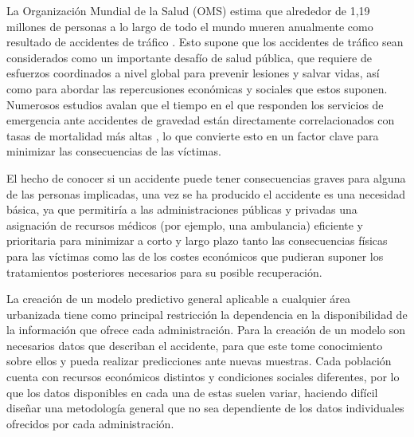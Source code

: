 \documentclass{uathesis-es}
\begin{document}






La Organización Mundial de la Salud (OMS) estima que alrededor de 1,19 millones de personas a lo largo de todo el mundo mueren anualmente como resultado de accidentes de tráfico \cite{WHO}. Esto supone que los accidentes de tráfico sean considerados como un importante desafío de salud pública, que requiere de esfuerzos coordinados a nivel global para prevenir lesiones y salvar vidas, así como para abordar las repercusiones económicas y sociales que estos suponen. Numerosos estudios avalan que el tiempo en el que responden los servicios de emergencia ante accidentes de gravedad están directamente correlacionados con tasas de mortalidad más altas \cite{timeresponse_deaths}, lo que convierte esto en un factor clave para minimizar las consecuencias de las víctimas.



El hecho de conocer si un accidente puede tener consecuencias graves para alguna de las personas implicadas, una vez se ha producido el accidente es una necesidad básica, ya que permitiría a las administraciones públicas y privadas una asignación de recursos médicos (por ejemplo, una ambulancia) eficiente y prioritaria para minimizar a corto y largo plazo tanto las consecuencias físicas para las víctimas como las de los costes económicos que pudieran suponer los tratamientos posteriores necesarios para su posible recuperación.  


La creación de un modelo predictivo general aplicable a cualquier área urbanizada tiene como principal restricción la dependencia en la disponibilidad de la información que ofrece cada administración. Para la creación de un modelo son necesarios datos que describan el accidente, para que este tome conocimiento sobre ellos y pueda realizar predicciones ante nuevas muestras. Cada población cuenta con recursos económicos distintos y condiciones sociales diferentes, por lo que los datos disponibles en cada una de estas suelen variar, haciendo difícil diseñar una metodología general que no sea dependiente de los datos individuales ofrecidos por cada administración.
 
\end{document}
